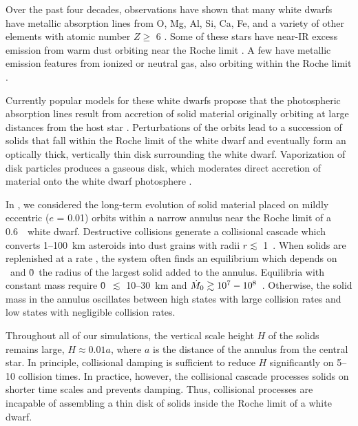 \documentclass[12pt,preprint]{aastex}
\begin{document}
Over the past four decades, observations have shown that many white dwarfs have 
metallic absorption lines from O, Mg, Al, Si, Ca, Fe, and a variety of other elements 
with atomic number $Z \ge$ 6 \citep[e.g.,][and references therein]{shipman1977,
cottrell1980,shipman1983,lacombe1983,liebert1987,kenyon1988,sion1990,zuckerman1998,
jura2014,koester2014,kepler2016,xu2017}. 
Some of these stars have near-IR excess emission from warm dust orbiting near the 
Roche limit 
\citep[e.g.,][]{kilic2005,reach2005,hansen2006,tremblay2007,vonhippel2007,farihi2009,
girven2011, debes2011,chu2011,barber2012,hoard2013,barber2014,bergfors2014,
rocchetto2015,farihi2016,bonsor2017}. 
A few have metallic emission features from ionized or neutral gas, also orbiting 
within the Roche limit \citep[e.g.,][]{gansicke2006,gansicke2007,gansicke2008,
melis2010b,farihi2012,melis2012a,debes2012b,wilson2014}.

Currently popular models for these white dwarfs propose that the photospheric absorption 
lines result from accretion of solid material originally orbiting at large distances 
from the host star \citep[e.g.,][]{alcock1980b,lacombe1983,alcock1986,jura2003,
koester2006,jura2007b,jura2007a,wyatt2014,veras2016}. 
Perturbations of the orbits lead to a succession of solids that
fall within the Roche limit of the white dwarf and eventually form an
optically thick, vertically thin disk surrounding the white dwarf. Vaporization
of disk particles produces a gaseous disk, which moderates direct accretion of 
material onto the white dwarf photosphere \citep[e.g.,][]{debes2002,jura2003,
jura2008,rafikov2011a,debes2012a,metzger2012,veras2013,brown2017}.  

In \citet[][hereafter KB2017]{kb2017b}, we considered the long-term evolution 
of solid material placed on mildly eccentric ($e$ = 0.01) orbits within a 
narrow annulus near the Roche limit of a 0.6~\msun\ white dwarf. Destructive 
collisions generate a collisional cascade which converts 1--100~km asteroids 
into dust grains with radii $r \lesssim$ 1~\mum. When solids are replenished 
at a rate \mdotz, the system often finds an equilibrium which depends on 
\mdotz\ and \r0\ the radius of the largest solid added to the annulus.  
Equilibria with constant mass require \r0\ $\lesssim$ 10--30~km and 
$\mdotz \gtrsim 10^7 - 10^8$~\gs. Otherwise, the solid mass in the annulus
oscillates between high states with large collision rates and low states with 
negligible collision rates.

Throughout all of our simulations, the vertical scale height $H$ of the solids 
remains large, $H \approx 0.01 a$, where $a$ is the distance of the annulus 
from the central star. In principle, collisional damping is sufficient to reduce 
$H$ significantly on 5--10 collision times. In practice, however, the collisional
cascade processes solids on shorter time scales and prevents damping. Thus, 
collisional processes are incapable of assembling a thin disk of solids inside
the Roche limit of a white dwarf. 
\end{document}
